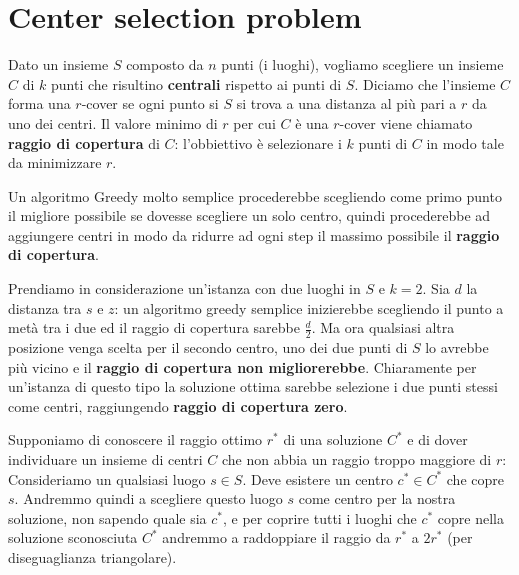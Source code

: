 \documentclass[\main/main.tex]{subfiles}
\begin{document}
\section{Center selection problem}
\begin{multicols}{2}
\begin{problem}
    Dato un insieme \(S\) composto da \(n\) punti (i luoghi), vogliamo scegliere un insieme \(C\) di \(k\) punti che risultino \textbf{centrali} rispetto ai punti di \(S\). Diciamo che l'insieme \(C\) forma una \(r\)-cover se ogni punto si \(S\) si trova a una distanza al più pari a \(r\) da uno dei centri. Il valore minimo di \(r\) per cui \(C\) è una \(r\)-cover viene chiamato \textbf{raggio di copertura} di \(C\): l'obbiettivo è selezionare i \(k\) punti di \(C\) in modo tale da minimizzare \(r\).
\end{problem}
\begin{definition}
    Un algoritmo Greedy molto semplice procederebbe scegliendo come primo punto il migliore possibile se dovesse scegliere un solo centro, quindi procederebbe ad aggiungere centri in modo da ridurre ad ogni step il massimo possibile il \textbf{raggio di copertura}.
\end{definition}
\begin{observation}
    Prendiamo in considerazione un'istanza con due luoghi in \(S\) e \(k=2\). Sia \(d\) la distanza tra \(s\) e \(z\): un algoritmo greedy semplice inizierebbe scegliendo il punto a metà tra i due ed il raggio di copertura sarebbe \(\frac{d}{2}\). Ma ora qualsiasi altra posizione venga scelta per il secondo centro, uno dei due punti di \(S\) lo avrebbe più vicino e il \textbf{raggio di copertura non migliorerebbe}. Chiaramente per un'istanza di questo tipo la soluzione ottima sarebbe selezione i due punti stessi come centri, raggiungendo \textbf{raggio di copertura zero}.
\end{observation}
\begin{observation}
    Supponiamo di conoscere il raggio ottimo \(r^*\) di una soluzione \(C^*\) e di dover individuare un insieme di centri \(C\) che non abbia un raggio troppo maggiore di \(r\): Consideriamo un qualsiasi luogo \(s \in S\). Deve esistere un centro \(c^* \in C^*\) che copre \(s\). Andremmo quindi a scegliere questo luogo \(s\) come centro per la nostra soluzione, non sapendo quale sia \(c^*\), e per coprire tutti i luoghi che \(c^*\) copre nella soluzione sconosciuta \(C^*\) andremmo a raddoppiare il raggio da \(r^*\) a \(2r^*\) (per diseguaglianza triangolare).
    

\end{observation}
\end{multicols}
\end{document}
